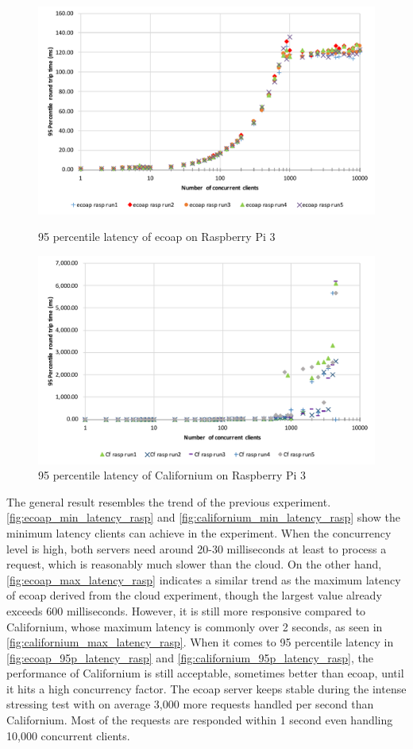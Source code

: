 \begin{figure}[!htbp]
\centering
\includegraphics[scale = 0.7]{ecoap_95p_latency_rasp}
\caption{95 percentile latency of ecoap on Raspberry Pi 3}
\label{fig:ecoap_95p_latency_rasp}
\includegraphics[scale = 0.7]{californium_95p_latency_rasp}
\caption{95 percentile latency of Californium on Raspberry Pi 3}
\label{fig:californium_95p_latency_rasp}
\end{figure}

The general result resembles the trend of the previous experiment. \autoref{fig:ecoap_min_latency_rasp} and \autoref{fig:californium_min_latency_rasp} show the minimum latency clients can achieve in the experiment. When the concurrency level is high, both servers need around 20-30 milliseconds at least to process a request, which is reasonably much slower than the cloud.
On the other hand, \autoref{fig:ecoap_max_latency_rasp} indicates a similar trend as the maximum latency of ecoap derived from the cloud experiment, though the largest value already exceeds 600 milliseconds. However, it is still more responsive compared to Californium, whose maximum latency is commonly over 2 seconds, as seen in \autoref{fig:californium_max_latency_rasp}. When it comes to 95 percentile latency in \autoref{fig:ecoap_95p_latency_rasp} and \autoref{fig:californium_95p_latency_rasp}, the performance of Californium is still acceptable, sometimes better than ecoap, until it hits a high concurrency factor. The ecoap server keeps stable during the intense stressing test with on average 3,000 more requests handled per second than Californium. Most of the requests are responded within 1 second even handling 10,000 concurrent clients.


